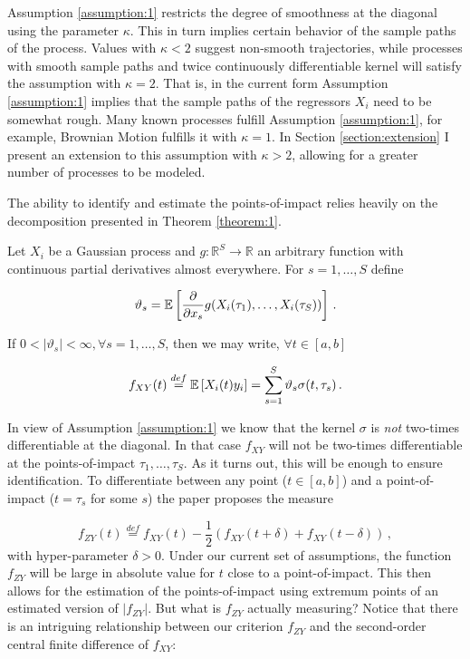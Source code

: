 Assumption \ref{assumption:1} restricts the degree of smoothness at the diagonal using
the parameter $\kappa$. This in turn implies certain behavior of the sample paths of the
process. Values with $\kappa < 2$ suggest non-smooth trajectories, while processes with
smooth sample paths and twice continuously differentiable kernel will satisfy the
assumption with $\kappa = 2$. That is, in the current form Assumption \ref{assumption:1}
implies that the sample paths of the regressors $X_i$ need to be somewhat rough. Many
known processes fulfill Assumption \ref{assumption:1}, for example, Brownian Motion
fulfills it with $\kappa = 1$. In Section \ref{section:extension} I present an extension
to this assumption with $\kappa > 2$, allowing for a greater number of processes to be
modeled.


The ability to identify and estimate the points-of-impact relies heavily on the
decomposition presented in Theorem \ref{theorem:1}.


\begin{theorem}
Let $X_i$ be a Gaussian process and $g : \mathbb{R}^S \to \mathbb{R}$ an arbitrary
function with continuous partial derivatives almost everywhere. For $s=1,\dots,S$ define

\[
    \vartheta_s = \mathbb{E}\left[\frac{\partial}{\partial x_s} g(X_i(\tau_1), \dots,
    X_i(\tau_S))\right] \,.
\]

If $0 < \left| \vartheta_s \right| < \infty, \forall s=1,\dots,S$, then we may write,
$\forall t \in [a, b]$

\[
    f_{XY}(t) \stackrel{def}{=} \mathbb{E}\left[X_i(t) y_i\right] = \sum_{s=1}^S \vartheta_s
    \sigma(t, \tau_s) \,.
\]
\label{theorem:1}
\end{theorem}


In view of Assumption \ref{assumption:1} we know that the kernel $\sigma$ is \emph{not}
two-times differentiable at the diagonal. In that case $f_{XY}$ will not be two-times
differentiable at the points-of-impact $\tau_1, \dots, \tau_S$. As it turns out, this
will be enough to ensure identification. To differentiate between any point ($t \in [a,
b]$) and a point-of-impact ($t = \tau_s$ for some $s$) the paper proposes the measure

\[
    f_{ZY}(t) \stackrel{def}{=} f_{XY}(t) - \frac{1}{2} \left( f_{XY}(t + \delta) +
    f_{XY}(t - \delta) \right) \,,
\]
with hyper-parameter $\delta > 0$. Under our current set of assumptions, the function
$f_{ZY}$ will be large in absolute value for $t$ close to a point-of-impact. This then
allows for the estimation of the points-of-impact using extremum points of an estimated
version of $|f_{ZY}|$. But what is $f_{ZY}$ actually measuring? Notice that there is an
intriguing relationship between our criterion $f_{ZY}$ and the second-order central
finite difference of $f_{XY}$:

